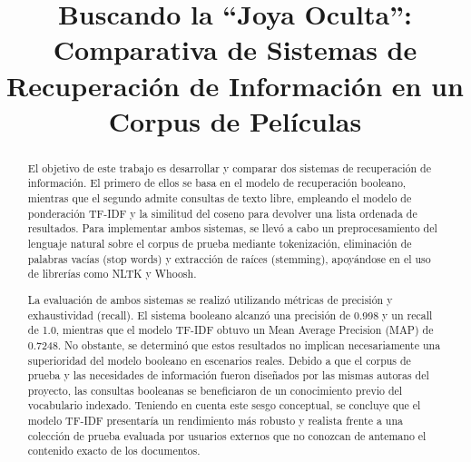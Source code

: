 \documentclass[conference,a4paper]{IEEEtran}
\begin{document}
\title{Buscando la ``Joya Oculta'': Comparativa de Sistemas de Recuperación de Información en un Corpus de Películas}

\author{
  
  \and
  
}

\maketitle


\begin{abstract}
 El objetivo de este trabajo es desarrollar y comparar dos sistemas de 
 recuperación de información. El primero de ellos se basa en el modelo de 
 recuperación booleano, mientras que el segundo admite consultas de texto libre, 
 empleando el modelo de ponderación TF-IDF y la similitud del coseno para 
 devolver una lista ordenada de resultados. Para implementar ambos sistemas, 
 se llevó a cabo un preprocesamiento del lenguaje natural sobre el corpus 
 de prueba mediante tokenización, eliminación de palabras vacías (stop words) y 
 extracción de raíces (stemming), apoyándose en el uso de librerías como NLTK y Whoosh.

 La evaluación de ambos sistemas se realizó utilizando métricas de precisión y 
 exhaustividad (recall). El sistema booleano alcanzó una precisión de 0.998 y 
 un recall de 1.0, mientras que el modelo TF-IDF obtuvo un Mean Average 
 Precision (MAP) de 0.7248. No obstante, se determinó que estos resultados no 
 implican necesariamente una superioridad del modelo booleano en escenarios reales. 
 Debido a que el corpus de prueba y las necesidades de información fueron diseñados 
 por las mismas autoras del proyecto, las consultas booleanas se beneficiaron de un 
 conocimiento previo del vocabulario indexado. Teniendo en cuenta este sesgo 
 conceptual, se concluye que el modelo TF-IDF presentaría un rendimiento más 
 robusto y realista frente a una colección de prueba evaluada por usuarios 
 externos que no conozcan de antemano el contenido exacto de los documentos.

\end{abstract}
\end{document}

